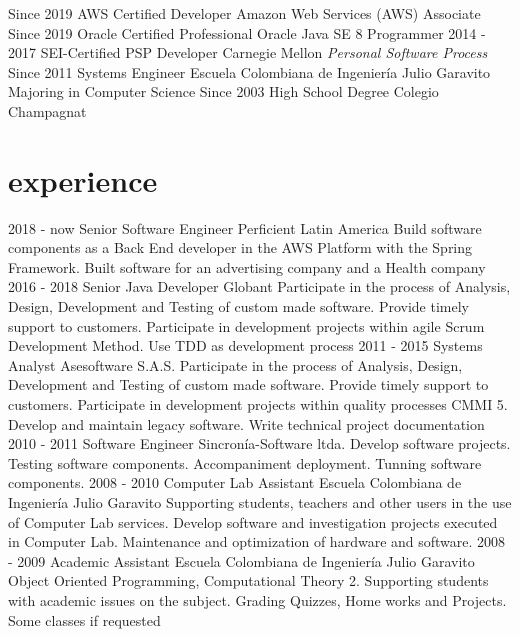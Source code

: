 \documentclass[]{twentysecondcv}
\begin{document}
\begin{twenty}
  \twentyitem
    {Since 2019}
    {AWS Certified Developer}
    {Amazon Web Services (AWS)}
    {Associate}
  \twentyitem
    {Since 2019}
    {Oracle Certified Professional}
    {Oracle}
    {Java SE 8 Programmer}
  \twentyitem
    {2014 - 2017}
    {SEI-Certified PSP Developer}
    {Carnegie Mellon}
    {\emph{Personal Software Process}}
  \twentyitem
    {Since 2011}
    {Systems Engineer}
    {Escuela Colombiana de Ingenier\'ia  Julio Garavito}
    {Majoring in Computer Science}
  \twentyitem
    {Since 2003}
    {High School Degree}
    {Colegio Champagnat}
    {}
\end{twenty}


\section{experience}

\begin{twentyshort}
\twentyitem
    {2018 - now}
    {Senior Software Engineer}
    {Perficient Latin America}
    {Build software components as a Back End developer in the AWS Platform with the Spring Framework. Built software for an advertising company and a Health company}
\twentyitem
    {2016 - 2018}
    {Senior Java Developer}
    {Globant}
    {Participate in the process of Analysis, Design, Development and Testing of custom made software. Provide timely support to customers. Participate in development projects within agile Scrum Development Method. Use TDD as development process}
  \twentyitem
    {2011 - 2015}
    {Systems Analyst}
    {Asesoftware S.A.S.}
    {Participate in the process of Analysis, Design, Development and Testing of custom made software. Provide timely support to customers. Participate in development projects within quality processes CMMI 5. Develop and maintain legacy software. Write technical project documentation}
  \twentyitem
    {2010 - 2011}
    {Software Engineer}
    {Sincron\'ia-Software ltda.}
    {Develop software projects. Testing software components. Accompaniment deployment. Tunning software components.}
\twentyitem
    {2008 - 2010}
    {Computer Lab Assistant}
    {Escuela Colombiana de Ingenier\'ia  Julio Garavito}
    {Supporting students, teachers and other users in the use of Computer Lab services. Develop software and investigation projects executed in Computer Lab. Maintenance and optimization of hardware and software.}
\twentyitem
    {2008 - 2009}
    {Academic Assistant}
    {Escuela Colombiana de Ingenier\'ia  Julio Garavito}
    {Object Oriented Programming, Computational Theory 2. Supporting students with academic issues on the subject. Grading Quizzes, Home works and Projects. Some classes if requested}
\end{twentyshort}
\end{document}
